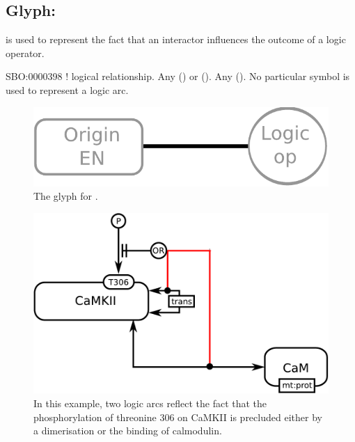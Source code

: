 \subsection{Glyph:  }\label{sec:logicArc}

 is used to represent the fact that an interactor influences
the outcome of a logic operator. 

\begin{glyphDescription}
 \glyphSboTerm SBO:0000398 ! logical relationship.
 \glyphOrigin Any  () or  ().
 \glyphTarget Any  ().
 \glyphEndPoint No particular symbol is used to represent a logic arc.
 \end{glyphDescription}

\begin{figure}[H]
  \centering
  \includegraphics[scale = 0.4]{images/logicArc}
  \caption{The \ER glyph for .}
  \label{fig:logicArc}
\end{figure}

\begin{figure}[H]
  \centering
  \includegraphics[scale = 0.5]{examples/ex-logicArc}
  \caption{In this example, two logic arcs reflect the fact that the phosphorylation of threonine 306 on CaMKII is precluded either by a dimerisation or the binding of calmodulin.}
  \label{fig:ex-logicArc}
\end{figure}

